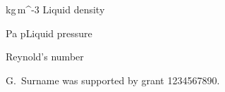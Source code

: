 \documentclass[eprint]{actapoly}
\begin{document}
\begin{nomenclature}
\item[kg\,m^-3]{\varrho}{Liquid density}
\item[Pa]{p}{Liquid pressure}
\medskip
\item{}{Reynold's number}
\end{nomenclature}



\begin{acknowledgements}
G.~Surname was supported by grant 1234567890.
\end{acknowledgements}





\end{document}
